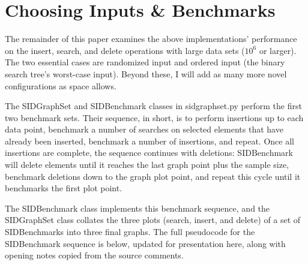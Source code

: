 \documentclass{article}
\begin{document}
\section{Choosing Inputs \& Benchmarks}
The remainder of this paper examines the above implementations' performance on the insert, search, and delete operations with large data sets ($10^6$ or larger). The two essential cases are randomized input and ordered input (the binary search tree's worst-case input). Beyond these, I will add as many more novel configurations as space allows.

The SIDGraphSet and SIDBenchmark classes in sidgraphset.py perform the first two benchmark sets. Their sequence, in short, is to perform insertions up to each data point, benchmark a number of searches on selected elements that have already been inserted, benchmark a number of insertions, and repeat. Once all insertions are complete, the sequence continues with deletions: SIDBenchmark will delete elements until it reaches the last graph point plus the sample size, benchmark deletions down to the graph plot point, and repeat this cycle until it benchmarks the first plot point.

The SIDBenchmark class implements this benchmark sequence, and the SIDGraphSet class collates the three plots (search, insert, and delete) of a set of SIDBenchmarks into three final graphs. The full pseudocode for the SIDBenchmark sequence is below, updated for presentation here, along with opening notes copied from the source comments.
\end{document}
